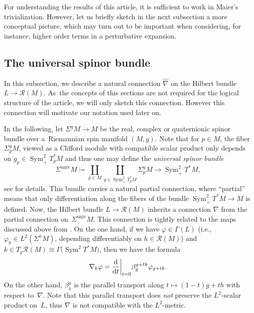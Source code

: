 \documentclass[pdftex]{sigma}
\def\phi{{\varphi}}
\newcommand\ceq{\coloneqq}
\DeclareMathOperator{\univ}{univ}
\newcommand\<{\langle}
\renewcommand\>{\rangle}
\newcommand\Sym[1][2]{\mathop{\mathrm{Sym}}\nolimits^{#1}}
\newcommand{\maR}{\mathcal R}
\theoremstyle{definition}
\let\define\emph
\newcommand\ie{i.e.,\ \ignorespaces}
\newcommand\={\,=\,}
\numberwithin{equation}{section}
\begin{document}
For understanding the results of this article, it is sufficient to work in Maier's trivialization.
However, let us briefly sketch in the next subsection a more conceptual picture,
which may turn out to be important when considering, for instance,
higher order terms in a perturbative expansion.

\subsection{The universal spinor bundle}

In this subsection, we describe a natural connection $\hat\nabla$ on the Hilbert bundle $L\to \maR(M)$. As~the concepts of this sections are not required for the logical structure of the article, we will only sketch this connection. However this connection will motivate our notation used later on.

In the following, let $\Sigma^g M\to M$ be the real, complex or quaternionic spinor bundle over a~Riemannian spin manifold $(M,g)$.
Note that for $p\in M$, the fiber $\Sigma^g_p M$, viewed as a Clifford module with compatible scalar product only depends on $g_p\in \Sym_+T^*_pM$ and thus one may define the \define{universal spinor bundle}
\[\Sigma^{\univ} M\ceq\coprod_{p\in M}\coprod_{g\in \Sym_+T^*_pM }\Sigma^g_p M\to \Sym_+ T^*M ,\]
see \cite{ammann.weiss.witt.math.ann:2016,ammann.weiss.witt.math.z:2016,mueller.nowaczyk:2017} for details.
This bundle carries a natural partial connection, where ``partial'' means that only differentiation along the fibers of the bundle $\Sym_+ T^*M\to M$ is defined. Now, the Hilbert bundle $L\to \maR(M)$ inherits a connection $\nabla$ from the partial connection on~$\Sigma^{\univ} M$. This connection is tightly related to the maps  discussed above from \cite{bourguignon.gauduchon:92}.
On the one hand, if we have $\phi\in \Gamma(L)$ \big(\ie $\phi_h\in L^2(\Sigma^h M)$, depending differentiably on $h\in \maR(M)$\big) and ${k\in T_g\maR(M)\cong \Gamma\big(\Sym T^*M\big)}$, then we have the formula
\[
\nabla_k\phi=\frac{{\rm d}}{{\rm d}t}\bigg|_{t=0}\beta^{g+tk}_g\phi_{g+tk} .
\]
On the other hand, $\beta^g_h$ is the parallel transport along $t\mapsto (1-t)g+th$ with respect to~$\nabla$.
Note that this parallel transport does \emph{not} preserve the $L^2$-scalar product on~$L$,
thus $\nabla$ is not compatible with the $L^2$-metric.
\end{document}
